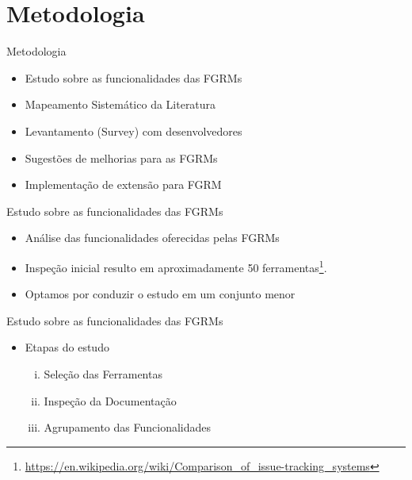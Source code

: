 \documentclass[t,14pt,mathserif]{beamer}
\begin{document}
\section{Metodologia}

\begin{frame}{Metodologia}

    \begin{itemize}
        \item Estudo sobre as funcionalidades das FGRMs
        \item Mapeamento Sistemático da Literatura~\cite{Petersen2008}
        \item Levantamento (Survey) com
              desenvolvedores~\cite{wohlin2012experimentation}
        \item Sugestões de melhorias para as FGRMs
        \item Implementação de extensão para FGRM
    \end{itemize}
\end{frame}
\begin{frame}{Estudo sobre as funcionalidades das FGRMs}

    \begin{itemize}
        \item Análise das funcionalidades oferecidas pelas FGRMs
        \item Inspeção inicial resulto em aproximadamente 50
            ferramentas\footnote{\url{https://en.wikipedia.org/wiki/Comparison_of_issue-tracking_systems}}.
        \item Optamos por conduzir o estudo em um conjunto menor
    \end{itemize}

\end{frame}

\begin{frame}{Estudo sobre as funcionalidades das FGRMs}
    \begin{itemize}
        \item Etapas do estudo
            \begin{enumerate}[(i)]
                \item Seleção das Ferramentas
                \item Inspeção da Documentação
                \item Agrupamento das Funcionalidades
            \end{enumerate}
    \end{itemize}
\end{frame}
\end{document}
